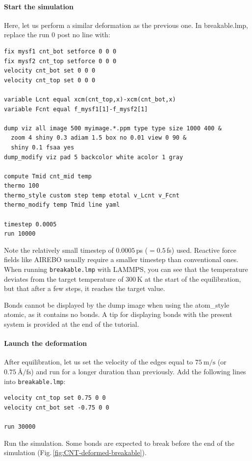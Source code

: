 \documentclass[9pt,tutorial]{livecoms}
\newcommand{\lmpcmd}[1]{\hspace{0pt}\colorbox{listing}{\textcolor{command}{\small{#1}}}\hspace{0pt}} %
\newcommand{\lmpcmdnote}[1]{\hspace{0pt}\colorbox{note_listing}{\textcolor{command}{\small{#1}}}\hspace{0pt}} %
\newcommand{\flecmd}[1]{\textcolor{command}{\texttt{#1}}} %
\begin{document}
\paragraph{Start the simulation}

Here, let us perform a similar deformation as the previous one.
In \lmpcmd{breakable.lmp}, replace the \lmpcmd{run 0 post no} line with:
\begin{lstlisting}
fix mysf1 cnt_bot setforce 0 0 0
fix mysf2 cnt_top setforce 0 0 0
velocity cnt_bot set 0 0 0
velocity cnt_top set 0 0 0

variable Lcnt equal xcm(cnt_top,x)-xcm(cnt_bot,x)
variable Fcnt equal f_mysf1[1]-f_mysf2[1]

dump viz all image 500 myimage.*.ppm type type size 1000 400 &
  zoom 4 shiny 0.3 adiam 1.5 box no 0.01 view 0 90 &
  shiny 0.1 fsaa yes
dump_modify viz pad 5 backcolor white acolor 1 gray

compute Tmid cnt_mid temp
thermo 100
thermo_style custom step temp etotal v_Lcnt v_Fcnt
thermo_modify temp Tmid line yaml

timestep 0.0005
run 10000
\end{lstlisting}
Note the relatively small timestep of $0.0005$\,ps ($= 0.5$\,fs) used.  Reactive force
fields like AIREBO usually require a smaller timestep than conventional ones.  When running
\flecmd{breakable.lmp} with LAMMPS, you can see that the temperature deviates
from the target temperature of $300\,\text{K}$ at the start of the equilibration,
but that after a few steps, it reaches the target value.

\begin{note}
  Bonds cannot be displayed by the \lmpcmdnote{dump image} when using
  the \lmpcmdnote{atom\_style atomic}, as it contains no bonds.
  A tip for displaying bonds with the present system is provided at
  the end of the tutorial.
\end{note}

\paragraph{Launch the deformation}

After equilibration, let us set the velocity of the edges equal to
$75~\text{m/s}$ (or $0.75~\text{\AA{}/fs}$) and run for a longer duration than
previously. Add the following lines into \flecmd{breakable.lmp}:
\begin{lstlisting}
velocity cnt_top set 0.75 0 0
velocity cnt_bot set -0.75 0 0

run 30000
\end{lstlisting}
Run the simulation.  Some bonds are expected to break before the end of the
simulation (Fig.\,\ref{fig:CNT-deformed-breakable}).
\end{document}

